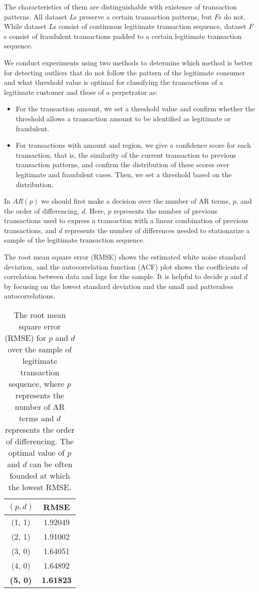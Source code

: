 \documentclass[final,authoryear,5p,times,twocolumn]{elsarticle}
\begin{document}
The characteristics of them are distinguishable with existence of transaction patterns. All dataset $L$s preserve a certain transaction patterns, but $F$s do not. While dataset $L$s consist of continuous legitimate transaction sequence, dataset $F$s consist of fraudulent transactions padded to a certain legitimate transaction sequence.

We conduct experiments using two methods to determine which method is better for detecting outliers that do not follow the pattern of the legitimate consumer and what threshold value is optimal for classifying the transactions of a legitimate customer and those of a perpetrator as:
\begin{itemize}
\item For the transaction amount, we set a threshold value and confirm whether the threshold allows a transaction amount to be identified as legitimate or fraudulent.
\item For transactions with amount and region, we give a confidence score for each transaction, that is, the similarity of the current transaction to previous transaction patterns, and confirm the distribution of these scores over legitimate and fraudulent cases. Then, we set a threshold based on the distribution.
\end{itemize}

In $AR(p)$ we should first make a decision over the number of AR terms, $p$, and the order of differencing, $d$. Here, $p$ represents the number of previous transactions used to express a transaction with a linear combination of previous transactions, and $d$ represents the number of differences needed to stationarize a sample of the legitimate transaction sequence.

The root mean square error (RMSE) shows the estimated white noise standard deviation, and the autocorrelation function (ACF) plot shows the coefficients of correlation between data and lags for the sample. It is helpful to decide $p$ and $d$ by focusing on the lowest standard deviation and the small and patternless autocorrelations.

\begin{table}[h]
\begin{center}
    \begin{tabular}{|c|c|}
    \hline
    $(p, d)$ & RMSE    \\ \hline
    (1, 1) & 1.92049 \\ 
    (2, 1) & 1.91002 \\ 
    (3, 0) & 1.64051 \\ 
    (4, 0) & 1.64892 \\ 
    \textbf{(5, 0)} & \textbf{1.61823} \\ \hline
    \end{tabular}
    \caption {The root mean square error (RMSE) for $p$ and $d$ over the sample of legitimate transaction sequence, where $p$ represents the number of AR terms and $d$ represents the order of differencing. The optimal value of $p$ and $d$ can be often founded at which the lowest RMSE.}
    \label{tab:rmse}
\end{center}
\end{table}
\end{document}
